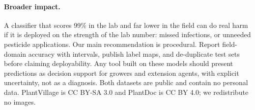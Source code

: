 \paragraph{Broader impact.}
A classifier that scores 99\% in the lab and far lower in the field can do real harm if it is deployed on the strength of the lab number: missed infections, or unneeded pesticide applications. Our main recommendation is procedural. Report field-domain accuracy with intervals, publish label maps, and de-duplicate test sets before claiming deployability. Any tool built on these models should present predictions as decision support for growers and extension agents, with explicit uncertainty, not as a diagnosis. Both datasets are public and contain no personal data. PlantVillage is CC BY-SA 3.0 and PlantDoc is CC BY 4.0; we redistribute no images.
